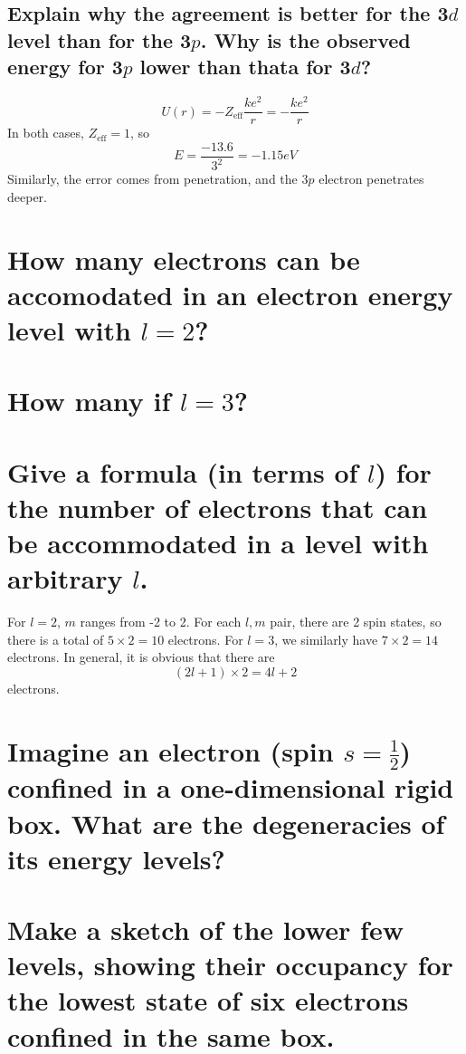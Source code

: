 \documentclass[answers]{exam}
\begin{document}
\begin{questions}
\begin{parts}
	\part{Explain why the agreement is better for the 3$d$ level than for the 3$p$. Why is the observed energy for 3$p$ lower than thata for 3$d$?}
\end{parts}

\begin{solution}
	$$U(r) = -Z_{\text{eff}}\frac{ke^2}{r} = -\frac{ke^2}{r}$$
	In both cases, $Z_{\text{eff}} = 1$, so
	$$E = \frac{-13.6}{3^2} = -1.15\unit{eV}$$
	Similarly, the error comes from penetration, and the 3$p$ electron penetrates deeper.
\end{solution}

\begin{parts}
	\part{How many electrons can be accomodated in an electron energy level with $l=2$?}
	\part{How many if $l=3$?}
	\part{Give a formula (in terms of $l$) for the number of electrons that can be accommodated in a level with arbitrary $l$.}
\end{parts}

\begin{solution}
	For $l=2$, $m$ ranges from -2 to 2. For each $l,m$ pair, there are 2 spin states, so there is a total of $5\times2=10$ electrons. For $l=3$, we similarly have $7\times2=14$ electrons. In general, it is obvious that there are
	$$(2l+1)\times2 = 4l+2$$
	electrons.
\end{solution}

\question{}

\begin{parts}
	\part{Imagine an electron (spin $s=\frac{1}{2}$) confined in a one-dimensional rigid box. What are the degeneracies of its energy levels?}
\part{Make a sketch of the lower few levels, showing their occupancy for the lowest state of six electrons confined in the same box.}
\end{parts}


\end{questions}
\end{document}
